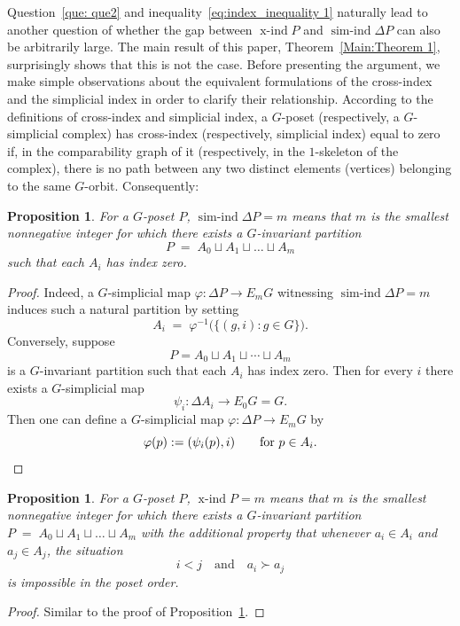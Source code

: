 \documentclass[preprint,12pt]{article}
\newtheorem{proposition}[theorem]{Proposition}
\theoremstyle{definition}
\theoremstyle{remark}
\numberwithin{equation}{section}
\DeclareMathOperator{\xind}{x-ind}
\DeclareMathOperator{\sind}{sim-ind}
\renewcommand{\phi}{\varphi}
\begin{document}
Question~\ref{que: que2} and inequality~\eqref{eq:index_inequality 1} naturally lead to another question of whether the gap between $\xind P$ and $\sind \Delta P$ can also be arbitrarily large. The main result of this paper, Theorem~\ref{Main:Theorem 1}, surprisingly shows that this is not the case. Before presenting the argument, we make simple observations about the equivalent formulations of the cross-index and the simplicial index in order to clarify their relationship. According to the definitions of cross-index and simplicial index, a $G$-poset (respectively, a $G$-simplicial complex) has cross-index (respectively, simplicial index) equal to zero if, in the comparability graph of it (respectively, in the $1$-skeleton of the complex), there is no path between any two distinct elements (vertices) belonging to the same $G$-orbit. Consequently:

\begin{proposition}
\label{proposition:partition-sind}
For a $G$-poset $P$, $\sind \Delta P= m$ means that $m$ is the smallest nonnegative integer for which there exists a $G$-invariant partition
\[
P \;=\; A_0 \sqcup A_1 \sqcup \dots \sqcup A_m
\]
such that each $A_i$ has index zero.
\end{proposition} 
\begin{proof}
Indeed, a $G$-simplicial map $\phi\colon \Delta P\to E_m G$ witnessing $\sind \Delta P=m$ induces such a natural partition by setting
\[
A_i \;=\; \phi^{-1}\bigl(\{(g,i): g\in G\}\bigr).
\]
Conversely, suppose
\[
P=A_0\sqcup A_1\sqcup\cdots\sqcup A_m
\]
is a \(G\)-invariant partition such that each \(A_i\) has index zero. Then for every \(i\) there exists a
\(G\)-simplicial map
\[
\psi_i\colon \Delta A_i\to E_0G=G .
\]
Then one can define a
\(G\)-simplicial map \(\phi\colon \Delta P\to E_mG\) by
\[
\phi(p):=(\psi_i(p),i)\qquad\text{for }p\in A_i.\qedhere
\]
\end{proof}

\begin{proposition}
\label{proposition:partition-xind}
For a $G$-poset $P$, $\xind P = m$ means that $m$ is the smallest nonnegative integer for which there exists a $G$-invariant partition $P \;=\; A_0 \sqcup A_1 \sqcup \dots \sqcup A_m$ with the additional property that whenever $a_i\in A_i$ and $a_j\in A_j$, the situation
\[
i<j \quad\text{and}\quad a_i \succ a_j
\]
is impossible in the poset order.
\end{proposition}
\begin{proof}
Similar to the proof of Proposition~\ref{proposition:partition-sind}.
\end{proof}
\end{document}
